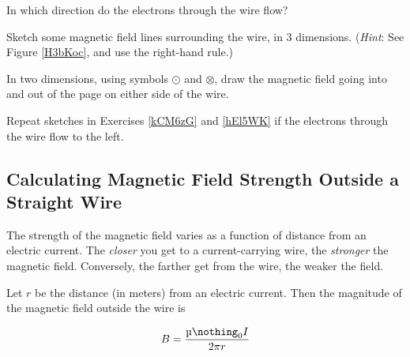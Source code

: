 \documentclass{article}
\numberwithin{equation}{section}
\numberwithin{figure}{section}
\begin{document}
\begin{exercise} \label{HBsxRL}
    In which direction do the electrons through the wire flow?
\end{exercise}

\begin{exercise} \label{kCM6zG}
    Sketch some magnetic field lines surrounding the wire, in 3 dimensions. (\textit{Hint}: See Figure \ref{H3bKoc}, and use the right-hand rule.)
\end{exercise}

\begin{exercise} \label{hEl5WK}
    In two dimensions, using symbols $\odot$ and $\otimes$, draw the magnetic field going into and out of the page on either side of the wire.
\end{exercise}

\begin{exercise} \label{JE9nz0}
    Repeat sketches in Exercises \ref{kCM6zG} and \ref{hEl5WK} if the electrons through the wire flow to the left. 
\end{exercise}

\clearpage

\subsection{Calculating Magnetic Field Strength Outside a Straight Wire} \label{NErSiN}
The strength of the magnetic field varies as a function of distance from an electric current. The \textit{closer} you get to a current-carrying wire, the \textit{stronger} the magnetic field. Conversely, the farther get from the wire, the weaker the field. 

\begin{center}
\end{center}



Let $r$ be the distance (in meters) from an electric current. Then the magnitude of the magnetic field outside the wire is

\begin{equation} \label{bJjNpw}
    B=\frac{\mymu_0 I}{2\pi r}
\end{equation}
\end{document}
